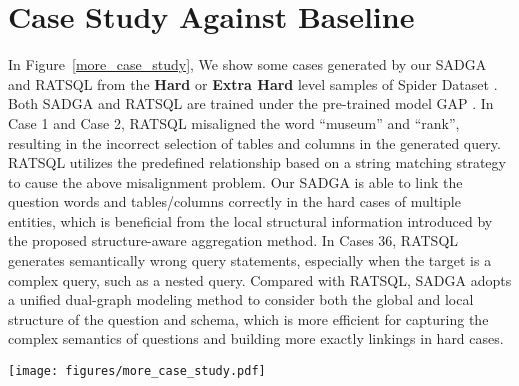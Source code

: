 \documentclass{article}
\begin{document}
\section{Case Study Against Baseline}
\label{app_case_study_against_baseline}
In Figure~\ref{more_case_study}, We show some cases generated by our SADGA and RATSQL \citep{wang2020rat} from the \textbf{Hard} or \textbf{Extra Hard} level samples of Spider Dataset \citep{yu2018spider}. Both SADGA and RATSQL are trained under the pre-trained model GAP \citep{shi2021learning}. In Case 1 and Case 2, RATSQL misaligned the word ``museum'' and ``rank'', resulting in the incorrect selection of tables and columns in the generated query. RATSQL utilizes the predefined relationship based on a string matching strategy to cause the above misalignment problem. 
Our SADGA is able to link the question words and tables/columns correctly in the hard cases of multiple entities, which is beneficial from the local structural information introduced by the proposed structure-aware aggregation method. 
In Cases 36, RATSQL generates semantically wrong query statements, especially when the target is a complex query, such as a nested query. Compared with RATSQL, SADGA adopts a unified dual-graph modeling method to consider both the global and local structure of the question and schema, which is more efficient for capturing the complex semantics of questions and building more exactly linkings in hard cases. 

\begin{figure*}[bp]
  \centering
  \texttt{[image: figures/more\_case\_study.pdf]} 
  \caption{
  More cases at the \textbf{Hard} or \textbf{Extra Hard} level in different database schemas. (RATSQL + GAP vs. SADGA + GAP)
  } 
  \label{more_case_study}
\end{figure*}
\end{document}
